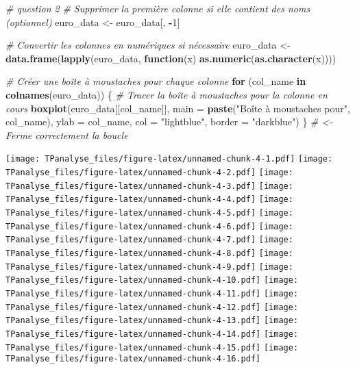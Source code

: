 \documentclass[
]{article}
\newenvironment{Shaded}{\begin{snugshade}}{\end{snugshade}}
\newcommand{\AttributeTok}[1]{\textcolor[rgb]{0.13,0.29,0.53}{#1}}
\newcommand{\CommentTok}[1]{\textcolor[rgb]{0.56,0.35,0.01}{\textit{#1}}}
\newcommand{\ControlFlowTok}[1]{\textcolor[rgb]{0.13,0.29,0.53}{\textbf{#1}}}
\newcommand{\DecValTok}[1]{\textcolor[rgb]{0.00,0.00,0.81}{#1}}
\newcommand{\FunctionTok}[1]{\textcolor[rgb]{0.13,0.29,0.53}{\textbf{#1}}}
\newcommand{\NormalTok}[1]{#1}
\newcommand{\OtherTok}[1]{\textcolor[rgb]{0.56,0.35,0.01}{#1}}
\newcommand{\SpecialCharTok}[1]{\textcolor[rgb]{0.81,0.36,0.00}{\textbf{#1}}}
\newcommand{\StringTok}[1]{\textcolor[rgb]{0.31,0.60,0.02}{#1}}
\begin{document}
\begin{Shaded}
\begin{Highlighting}[]
\CommentTok{\# question 2}
\CommentTok{\# Supprimer la première colonne si elle contient des noms (optionnel)}
\NormalTok{euro\_data }\OtherTok{\textless{}{-}}\NormalTok{ euro\_data[, }\SpecialCharTok{{-}}\DecValTok{1}\NormalTok{]}

\CommentTok{\# Convertir les colonnes en numériques si nécessaire}
\NormalTok{euro\_data }\OtherTok{\textless{}{-}} \FunctionTok{data.frame}\NormalTok{(}\FunctionTok{lapply}\NormalTok{(euro\_data, }\ControlFlowTok{function}\NormalTok{(x) }\FunctionTok{as.numeric}\NormalTok{(}\FunctionTok{as.character}\NormalTok{(x))))}

\CommentTok{\# Créer une boîte à moustaches pour chaque colonne}
\ControlFlowTok{for}\NormalTok{ (col\_name }\ControlFlowTok{in} \FunctionTok{colnames}\NormalTok{(euro\_data)) \{}
  \CommentTok{\# Tracer la boîte à moustaches pour la colonne en cours}
  \FunctionTok{boxplot}\NormalTok{(euro\_data[[col\_name]],}
          \AttributeTok{main =} \FunctionTok{paste}\NormalTok{(}\StringTok{"Boîte à moustaches pour"}\NormalTok{, col\_name),}
          \AttributeTok{ylab =}\NormalTok{ col\_name,}
          \AttributeTok{col =} \StringTok{"lightblue"}\NormalTok{,}
          \AttributeTok{border =} \StringTok{"darkblue"}\NormalTok{)}
\NormalTok{\}  }\CommentTok{\# \textless{}{-} Ferme correctement la boucle}
\end{Highlighting}
\end{Shaded}

\texttt{[image: TPanalyse\_files/figure-latex/unnamed-chunk-4-1.pdf]}
\texttt{[image: TPanalyse\_files/figure-latex/unnamed-chunk-4-2.pdf]}
\texttt{[image: TPanalyse\_files/figure-latex/unnamed-chunk-4-3.pdf]}
\texttt{[image: TPanalyse\_files/figure-latex/unnamed-chunk-4-4.pdf]}
\texttt{[image: TPanalyse\_files/figure-latex/unnamed-chunk-4-5.pdf]}
\texttt{[image: TPanalyse\_files/figure-latex/unnamed-chunk-4-6.pdf]}
\texttt{[image: TPanalyse\_files/figure-latex/unnamed-chunk-4-7.pdf]}
\texttt{[image: TPanalyse\_files/figure-latex/unnamed-chunk-4-8.pdf]}
\texttt{[image: TPanalyse\_files/figure-latex/unnamed-chunk-4-9.pdf]}
\texttt{[image: TPanalyse\_files/figure-latex/unnamed-chunk-4-10.pdf]}
\texttt{[image: TPanalyse\_files/figure-latex/unnamed-chunk-4-11.pdf]}
\texttt{[image: TPanalyse\_files/figure-latex/unnamed-chunk-4-12.pdf]}
\texttt{[image: TPanalyse\_files/figure-latex/unnamed-chunk-4-13.pdf]}
\texttt{[image: TPanalyse\_files/figure-latex/unnamed-chunk-4-14.pdf]}
\texttt{[image: TPanalyse\_files/figure-latex/unnamed-chunk-4-15.pdf]}
\texttt{[image: TPanalyse\_files/figure-latex/unnamed-chunk-4-16.pdf]}
\end{document}
